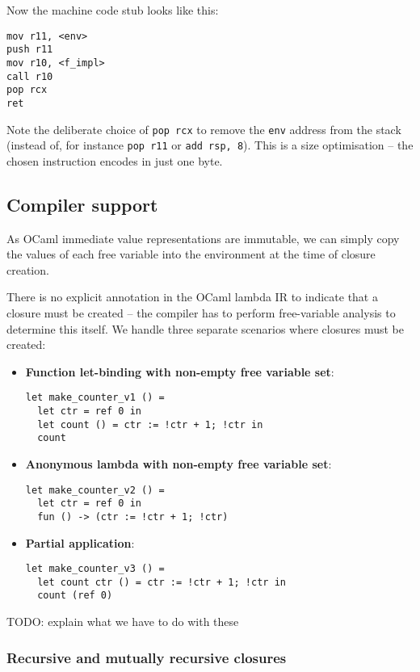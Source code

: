 \documentclass[12pt,a4paper,twoside,openright]{report}
\begin{document}
Now the machine code stub looks like this:

\begin{lstlisting}
mov r11, <env>
push r11
mov r10, <f_impl>
call r10
pop rcx
ret
\end{lstlisting}

Note the deliberate choice of \lstinline{pop rcx} to remove the
\lstinline{env} address from the stack (instead of, for instance
\lstinline{pop r11} or \lstinline{add rsp, 8}). This is a size optimisation --
the chosen instruction encodes in just one byte.

\subsection{Compiler support}\label{closures-compiler-support}

As OCaml immediate value representations are immutable, we can simply copy the
values of each free variable into the environment at the time of closure
creation.

There is no explicit annotation in the OCaml lambda IR to indicate that a
closure must be created -- the compiler has to perform free-variable analysis
to determine this itself. We handle three separate scenarios where closures
must be created:

\begin{itemize}
    \item \textbf{Function let-binding with non-empty free variable set}:
      \begin{lstlisting}
let make_counter_v1 () =
  let ctr = ref 0 in
  let count () = ctr := !ctr + 1; !ctr in
  count
      \end{lstlisting}
    \item \textbf{Anonymous lambda with non-empty free variable set}:
      \begin{lstlisting}
let make_counter_v2 () =
  let ctr = ref 0 in
  fun () -> (ctr := !ctr + 1; !ctr)
      \end{lstlisting}
    \item \textbf{Partial application}:
      \begin{lstlisting}
let make_counter_v3 () =
  let count ctr () = ctr := !ctr + 1; !ctr in
  count (ref 0)
      \end{lstlisting}
\end{itemize}

TODO: explain what we have to do with these

\subsubsection{Recursive and mutually recursive closures}
\end{document}
